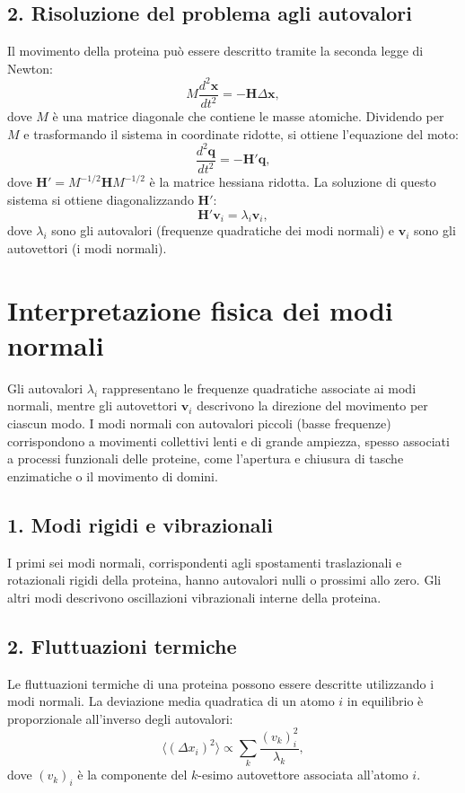 \documentclass[Lau,binding=0.6cm,oneside,noexaminfo]{sapthesis}
\begin{document}
\subsection*{2. Risoluzione del problema agli autovalori}
Il movimento della proteina può essere descritto tramite la seconda legge di Newton:
\[
M \frac{d^2 \mathbf{x}}{dt^2} = -\mathbf{H} \Delta \mathbf{x},
\]
dove $M$ è una matrice diagonale che contiene le masse atomiche. Dividendo per $M$ e trasformando il sistema in coordinate ridotte, si ottiene l'equazione del moto:
\[
\frac{d^2 \mathbf{q}}{dt^2} = -\mathbf{H}' \mathbf{q},
\]
dove $\mathbf{H}' = M^{-1/2} \mathbf{H} M^{-1/2}$ è la matrice hessiana ridotta. La soluzione di questo sistema si ottiene diagonalizzando $\mathbf{H}'$:
\[
\mathbf{H}' \mathbf{v}_i = \lambda_i \mathbf{v}_i,
\]
dove $\lambda_i$ sono gli autovalori (frequenze quadratiche dei modi normali) e $\mathbf{v}_i$ sono gli autovettori (i modi normali).

\section{Interpretazione fisica dei modi normali}

Gli autovalori $\lambda_i$ rappresentano le frequenze quadratiche associate ai modi normali, mentre gli autovettori $\mathbf{v}_i$ descrivono la direzione del movimento per ciascun modo. I modi normali con autovalori piccoli (basse frequenze) corrispondono a movimenti collettivi lenti e di grande ampiezza, spesso associati a processi funzionali delle proteine, come l'apertura e chiusura di tasche enzimatiche o il movimento di domini.

\subsection*{1. Modi rigidi e vibrazionali}
I primi sei modi normali, corrispondenti agli spostamenti traslazionali e rotazionali rigidi della proteina, hanno autovalori nulli o prossimi allo zero. Gli altri modi descrivono oscillazioni vibrazionali interne della proteina.

\subsection*{2. Fluttuazioni termiche}
Le fluttuazioni termiche di una proteina possono essere descritte utilizzando i modi normali. La deviazione media quadratica di un atomo $i$ in equilibrio è proporzionale all'inverso degli autovalori:
\[
\langle (\Delta x_i)^2 \rangle \propto \sum_{k} \frac{(v_k)_i^2}{\lambda_k},
\]
dove $(v_k)_i$ è la componente del $k$-esimo autovettore associata all’atomo $i$.
\end{document}
